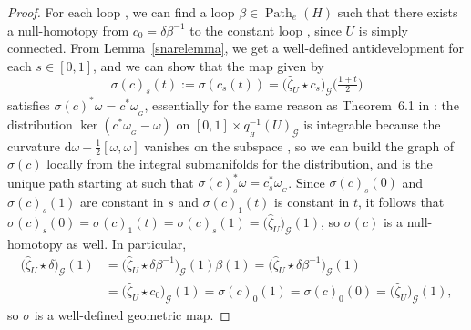 \documentclass[10pt,a4paper]{amsart}
\numberwithin{equation}{section}
\theoremstyle{definition}
\DeclareMathOperator{\Path}{Path}
\newcommand{\MC}[1]{\omega_{{}_{#1}}}
\begin{document}
\begin{proof}
For each loop \smash{$\delta\in\Path_{\hat{\zeta}_U(1)}\bigl(q_{{}_H}^{-1}(U)\bigr)$}, we can find a loop $\beta\in\Path_e(H)$ such that there exists a null-homotopy  from $c_0=\delta\beta^{-1}$ to the constant loop , since $U$ is simply connected. From Lemma~\ref{snarelemma}, we get a well-defined antidevelopment  for each $s\in[0,1]$, and we can show that the map  given by
\[\sigma(c)_s(t):=\sigma(c_s(t))=\bigl(\hat{\zeta}_U\star c_s\bigr)_\mathscr{G}\bigl(\tfrac{1+t}{2}\bigr)\]
satisfies $\sigma(c)^*\omega=c^*\MC{G}$, essentially for the same reason as Theorem~6.1 in \cite[Chapter~3]{Sharpe1997}: the distribution $\ker(c^*\MC{G}-\omega)$ on $[0,1]\times q_{{}_H}^{-1}(U)_\mathscr{G}$ is integrable because the curvature $\mathrm{d}\omega+\tfrac{1}{2}[\omega,\omega]$ vanishes on the subspace , so we can build the graph of $\sigma(c)$ locally from the integral submanifolds for the distribution, and  is the unique path starting at  such that $\sigma(c)_s^*\omega=c_s^*\MC{G}$. Since $\sigma(c)_s(0)$ and $\sigma(c)_s(1)$ are constant in $s$ and $\sigma(c)_1(t)$ is constant in $t$, it follows that $\sigma(c)_s(0)=\sigma(c)_1(t)=\sigma(c)_s(1)=\bigl(\hat{\zeta}_U\bigr)_\mathscr{G}(1)$, so $\sigma(c)$ is a null-homotopy as well. In particular,
\begin{align*}\bigl(\hat{\zeta}_U\star\delta\bigr)_\mathscr{G}(1) & =\bigl(\hat{\zeta}_U\star\delta\beta^{-1}\bigr)_\mathscr{G}(1)\beta(1)=\bigl(\hat{\zeta}_U\star\delta\beta^{-1}\bigr)_\mathscr{G}(1) \\ & =\bigl(\hat{\zeta}_U\star c_0\bigr)_\mathscr{G}(1)=\sigma(c)_0(1)=\sigma(c)_0(0)=\bigl(\hat{\zeta}_U\bigr)_\mathscr{G}(1),
\end{align*} so $\sigma$ is a well-defined geometric map.


\end{proof}
\end{document}
